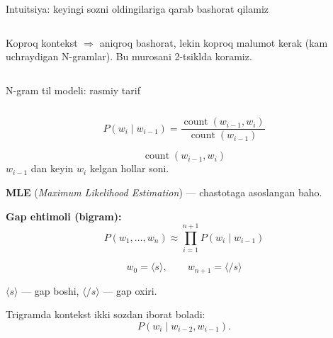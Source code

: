 \documentclass[aspectratio=169,11pt]{beamer}
\newcommand{\uzq}{\textquotesingle{}}
\begin{document}
\begin{frame}{Intuitsiya: keyingi so\uzq{}zni oldingilariga qarab bashorat qilamiz}
\begin{columns}[T,totalwidth=\textwidth]
\begin{column}{0.54\textwidth}
\vspace{4pt}

\begin{tcolorbox}[okbox,left=2mm,right=2mm,top=1mm,bottom=1mm]
\scriptsize
Ko\uzq{}proq kontekst $\Rightarrow$ aniqroq bashorat, lekin ko\uzq{}proq ma\uzq{}lumot
kerak (kam uchraydigan N-gramlar). Bu murosani 2-tsiklda ko\uzq{}ramiz.
\end{tcolorbox}
\end{column}
\end{columns}

\end{frame}

\begin{frame}{N-gram til modeli: rasmiy ta\uzq{}rif}
\footnotesize

\begin{columns}[T,totalwidth=\textwidth]
\begin{column}{0.53\textwidth}

\begin{tcolorbox}[defbox,left=2mm,right=2mm,top=1mm,bottom=1mm]
\[
P(w_i\mid w_{i-1})
=
\frac{\operatorname{count}(w_{i-1},w_i)}
{\operatorname{count}(w_{i-1})}
\]
\end{tcolorbox}

\vspace{2pt}

\[
\operatorname{count}(w_{i-1},w_i)
\]
{\scriptsize $w_{i-1}$ dan keyin $w_i$ kelgan hollar soni.}

\vspace{3pt}

\textbf{MLE} (\textit{Maximum Likelihood Estimation}) — chastotaga asoslangan baho.

\vspace{5pt}

\textbf{Gap ehtimoli (bigram):}
\[
P(w_1,\ldots,w_n)
\approx
\prod_{i=1}^{n+1}P(w_i\mid w_{i-1})
\]

\[
w_0=\langle s\rangle,\qquad
w_{n+1}=\langle/s\rangle
\]

{\scriptsize $\langle s\rangle$ — gap boshi, $\langle/s\rangle$ — gap oxiri.}

\vspace{4pt}

\begin{tcolorbox}[defbox,left=2mm,right=2mm,top=1mm,bottom=1mm]
\scriptsize
Trigramda kontekst ikki so\uzq{}zdan iborat bo\uzq{}ladi:
\[
P(w_i\mid w_{i-2},w_{i-1}).
\]
\end{tcolorbox}


\end{column}
\end{columns}
\end{frame}
\end{document}
